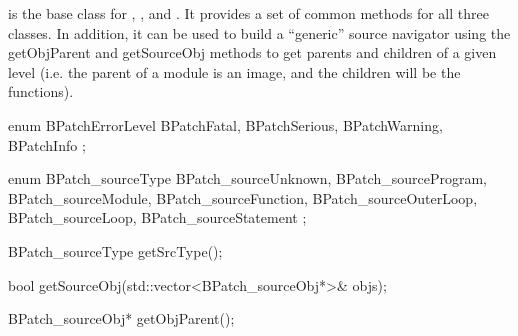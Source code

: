 
 is the base class for
, , and .
It provides a set of common methods for all three classes. In
addition, it can be used to build a ``generic'' source
navigator using the getObjParent and getSourceObj methods to get
parents and children of a given level (i.e. the parent
of a module is an image, and the children will be the functions).

\begin{apient}
  enum BPatchErrorLevel {
    BPatchFatal,
    BPatchSerious,
    BPatchWarning,
    BPatchInfo
  };
\end{apient}


\begin{apient}
  enum BPatch_sourceType {
    BPatch_sourceUnknown,
    BPatch_sourceProgram,
    BPatch_sourceModule,
    BPatch_sourceFunction,
    BPatch_sourceOuterLoop,
    BPatch_sourceLoop,
    BPatch_sourceStatement
  };
\end{apient}


\begin{apient}
  BPatch_sourceType getSrcType();
\end{apient}


\begin{apient}
  bool getSourceObj(std::vector<BPatch_sourceObj*>& objs);
\end{apient}


\begin{apient}
  BPatch_sourceObj* getObjParent();
\end{apient}


